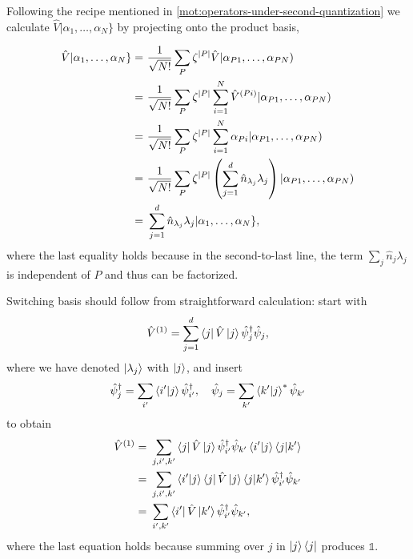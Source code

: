 \documentclass{article}
\theoremstyle{definition}
\theoremstyle{plain}
\numberwithin{equation}{section}
\begin{document}
Following the recipe mentioned 
in \cref{mot:operators-under-second-quantization}
we calculate $\hat{V}|\alpha_1, \ldots ,\alpha_{N}\}$ 
by projecting onto the product basis,

\begin{align*}
    \hat{V}|\alpha_1, \ldots ,\alpha_{N}\}
    =&\ 
    \frac{1}{\sqrt{N!}}
    \sum_{P}\zeta^{\abs{P}}
    \hat{V} |\alpha_{P1}, \ldots ,\alpha_{PN}) \\
    =&\ 
    \frac{1}{\sqrt{N!}}
    \sum_{P}\zeta^{\abs{P}}
    \sum_{i =1} ^{N}
    \hat{V}^{(Pi)}
    |\alpha_{P1}, \ldots ,\alpha_{PN}) \\
    =&\ 
    \frac{1}{\sqrt{N!}}
    \sum_{P}\zeta^{\abs{P}}
    \sum_{i = 1}^{N}
    \alpha_{Pi} |\alpha_{P1}, \ldots ,\alpha_{PN}) \\
    =&\ 
    \frac{1}{\sqrt{N!}}
    \sum_{P}\zeta^{\abs{P}}
    \left( 
        \sum_{j=1}^{d}
        \hat{n}_{\lambda_{j}}
        \lambda_{j}
    \right) 
    |\alpha_{P1}, \ldots ,\alpha_{PN}) \\
    =&\ 
    \sum_{j=1}^{d}
    \hat{n}_{\lambda_{j}}
    \lambda_{j}
    |\alpha_1, \ldots ,\alpha_{N}\},
\end{align*}
where the last equality holds 
because in the second-to-last line, 
the term $\sum_{j}\hat{n}_{j}\lambda_{j}$ 
is independent of $P$ and thus can be factorized. 

Switching basis should follow from straightforward 
calculation: start with 
\[
    \hat{V}^{(1)}
    =
    \sum_{j=1}^{d}
    \bra{j} \hat{V} \ket{j}
    \hat{\psi}^{\dagger}_{j}\hat{\psi}_{j},
\]
where we have denoted 
$\ket{\lambda_{j}}$ with $\ket{j}$, 
and insert 
\[
    \hat{\psi}^{\dagger}_{j}
    =
    \sum_{i'} \bra{i'} \ket{j}
    \hat{\psi}^{\dagger}_{i'}
    ,\quad
    \hat{\psi}_{j}
    =
    \sum_{k'} \bra{k'} \ket{j} ^{*}
    \hat{\psi}_{k'}
\]
to obtain
\begin{align*}
    \hat{V}^{(1)}=&\ 
    \sum_{j,i',k'}
    \bra{j}\hat{V} \ket{j}
    \hat{\psi}^{\dagger}_{i'}\hat{\psi}_{k'}
    \bra{i'} \ket{j} \bra{j} \ket{k'}
    \\
    =&\ 
    \sum_{j,i',k'}
    \bra{i'}\ket{j}\bra{j} \hat{V} \ket{j} \bra{j} \ket{k'}
    \hat{\psi}^{\dagger}_{i'}
    \hat{\psi}_{k'}
    \\
    =&\ 
    \sum_{i',k'}
    \bra{i'} \hat{V} \ket{k'}
    \hat{\psi}^{\dagger}_{i'} \hat{\psi}_{k'},
\end{align*}
where the last equation holds because 
summing over $j$ in $\ket{j} \bra{j}$ produces $\mathds{1}$.
\end{document}
